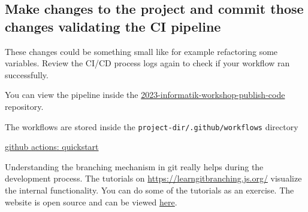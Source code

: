 \documentclass[paper=a4]{scrartcl}
\begin{document}
	\subsection*{Make changes to the project and commit those changes validating the CI pipeline}
		These changes could be something small like for example refactoring some variables. Review the CI/CD process logs again to check if your workflow ran successfully. 
		
	\begin{hints}
		\item You can view the pipeline inside the \href{https://github.com/marc-philipp-knechtle/2023-informatik-workshop-publish-code}{2023-informatik-workshop-publish-code} repository. 
		\item The workflows are stored inside the \texttt{project-dir/.github/workflows} directory
	\end{hints}
	
	\begin{literature}
		\item \href{https://docs.github.com/en/actions/quickstart}{github actions: quickstart}
	\end{literature}




	Understanding the branching mechanism in git really helps during the development process. The tutorials on \url{https://learngitbranching.js.org/} visualize the internal functionality. You can do some of the tutorials as an exercise. 
	\newline The website is open source and can be viewed \href{https://github.com/pcottle/learnGitBranchin}{here}. 
\end{document}
